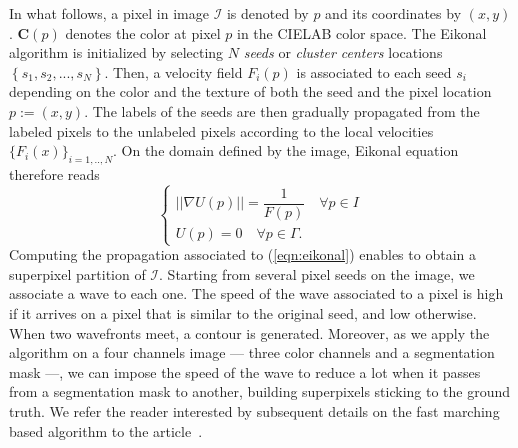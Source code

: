 \documentclass{article}
\begin{document}
            In what follows, a pixel in image $\mathcal{I}$ is denoted by $p$ and its coordinates by $(x, y)$. $\mathbf{C}(p)$ denotes the color at pixel $p$ in the CIELAB color space. The Eikonal algorithm is initialized by selecting $N$ \textit{seeds} or \textit{cluster centers} locations $\left\{s_1, s_2, ..., s_N \right\}$. Then, a velocity field $F_i(p)$ is associated to each seed $s_i$ depending on the color and the texture of both the seed and the pixel location $p:=(x, y)$. The labels of the seeds are then gradually propagated from the labeled pixels to the unlabeled pixels according to the local velocities $\{F_i(x)\}_{i = 1, .., N}$. On the domain defined by the image, Eikonal equation therefore reads
            \begin{equation}
              \begin{cases}
                ||\nabla U(p)|| = \dfrac{1}{F(p)}\quad \forall p \in I\\
                U(p) = 0    \quad \forall p \in \Gamma.
              \end{cases}
              \label{eqn:eikonal}
            \end{equation}
            Computing the propagation associated to (\ref{eqn:eikonal}) enables to obtain a superpixel partition of $\mathcal{I}$.
            Starting from several pixel seeds on the image, we associate a wave to each one. The speed of the wave associated to a pixel is high if it arrives on a pixel that is similar to the original seed, and low otherwise. When two wavefronts meet, a contour is generated. Moreover, as we apply the algorithm on a four channels image --- three color channels and a segmentation mask ---, we can impose the speed of the wave to reduce a lot when it passes from a segmentation mask to another, building superpixels sticking to the ground truth. We refer the reader interested by subsequent details on the fast marching based algorithm to the article~\cite{figliuzzi2019}.


\newpage
\end{document}
